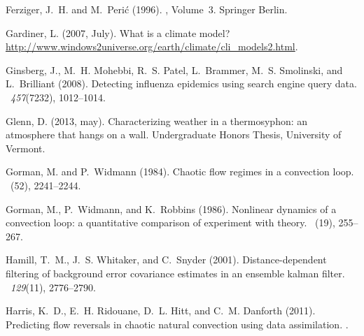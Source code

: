 \documentclass[12pt]{report}
\begin{document}
\begin{thebibliography}{}
Ferziger, J.~H. and M.~Peri{\'c} (1996).
, Volume~3.
\newblock Springer Berlin.

Gardiner, L. (2007, July).
\newblock What is a climate model?
\newblock \url{http://www.windows2universe.org/earth/climate/cli_models2.html}.

Ginsberg, J., M.~H. Mohebbi, R.~S. Patel, L.~Brammer, M.~S. Smolinski, and
  L.~Brilliant (2008).
\newblock Detecting influenza epidemics using search engine query data.
~{\em 457\/}(7232), 1012--1014.

Glenn, D. (2013, may).
\newblock Characterizing weather in a thermosyphon: an atmosphere that hangs on
  a wall.
\newblock Undergraduate Honors Thesis, University of Vermont.

Gorman, M. and P.~Widmann (1984).
\newblock Chaotic flow regimes in a convection loop.
~(52), 2241--2244.

Gorman, M., P.~Widmann, and K.~Robbins (1986).
\newblock Nonlinear dynamics of a convection loop: a quantitative comparison of
  experiment with theory.
~(19), 255--267.

Hamill, T.~M., J.~S. Whitaker, and C.~Snyder (2001).
\newblock Distance-dependent filtering of background error covariance estimates
  in an ensemble kalman filter.
~{\em 129\/}(11), 2776--2790.

Harris, K.~D., E.~H. Ridouane, D.~L. Hitt, and C.~M. Danforth (2011).
\newblock Predicting flow reversals in chaotic natural convection using data
  assimilation.
.


\end{thebibliography}
\end{document}
